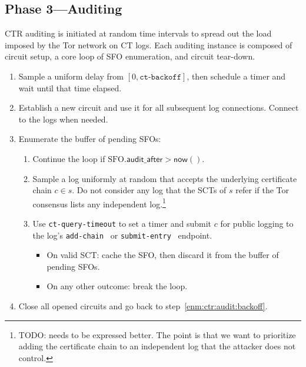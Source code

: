 \subsection{Phase 3---Auditing} \label{sec:base:phase3}
CTR auditing is initiated at random time intervals to spread out the load
imposed by the Tor network on CT logs.  Each auditing instance is composed of
circuit setup, a core loop of SFO enumeration, and circuit tear-down.

\begin{enumerate}
	\item\label{enm:ctr:audit:backoff} Sample a uniform delay from
			$[0, \texttt{ct-backoff}]$,
		then schedule a timer and wait until that time elapsed.
	\item\label{enm:ctr:audit:log-circuit} Establish a new circuit and use it
		for all subsequent log connections.  Connect to the logs when needed.
	\item\label{enm:ctr:audit:loop} Enumerate the buffer of pending SFOs:
		\begin{enumerate}
			\item\label{enm:ctr:audit:too-soon} Continue the loop if
				$\textrm{SFO}.\mathsf{audit\_after} > \mathsf{now}()$.
			\item\label{enm:ctr:audit:sample}
				Sample a log uniformly at random that accepts the underlying
				certificate chain $c \in s$.  Do not consider any log that the
				SCTs of $s$ refer if the Tor consensus lists any independent
				log.\footnote{%
					TODO: needs to be expressed better.  The point is that we
					want to prioritize adding the certificate chain to an
					independent log that the attacker does not control.
				}
			\item\label{enm:ctr:audit:log} Use \texttt{ct-query-timeout} to set
				a timer and submit $c$ for public logging to the log's
				\texttt{add-chain}~\cite{ct} or
				\texttt{submit-entry}~\cite{ct/bis} endpoint.
				\begin{itemize}
					\item\label{enm:ctr:audit:log:success} On valid
						SCT: cache the SFO, then discard it from the buffer of
						pending SFOs.
					\item\label{enm:ctr:audit:log:fail} On any other outcome:
						break the loop.
				\end{itemize}
		\end{enumerate}
	\item\label{enm:ctr:audit:teardown} Close all opened circuits and go back to
		step~\ref{enm:ctr:audit:backoff}.
\end{enumerate}

